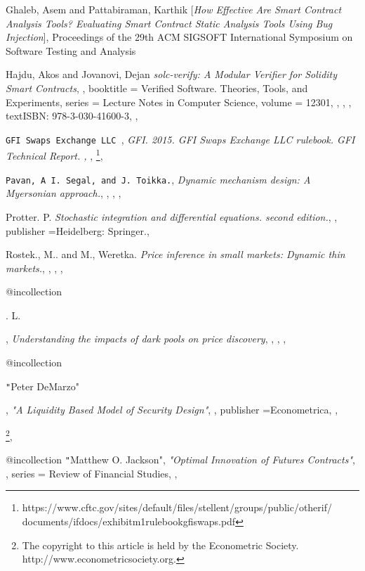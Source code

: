  \begin{thebibliography}{9}

Ghaleb, Asem and Pattabiraman, Karthik
[\textit{How Effective Are Smart Contract Analysis Tools? Evaluating Smart Contract Static Analysis Tools Using Bug Injection}],
Proceedings of the 29th ACM SIGSOFT International Symposium on Software Testing and Analysis

 
Hajdu, Akos and Jovanovi,  Dejan
\textit{solc-verify: A Modular Verifier for {S}olidity Smart Contracts},
,
    booktitle  = {Verified Software. Theories, Tools, and Experiments},
    series     = {Lecture Notes in Computer Science},
    volume     = {12301},
,
,
,
text{ISBN: 978-3-030-41600-3},
,


\texttt{GFI Swaps Exchange LLC },
\textit{GFI. 2015. GFI Swaps Exchange LLC rulebook. GFI Technical Report.
,
    },
\footnote{https://www.cftc.gov/sites/default/files/stellent/groups/public/otherif/
documents/ifdocs/exhibitm1rulebookgfiswaps.pdf},

   
\texttt{Pavan, A I. Segal, and J. Toikka.},
\textit{Dynamic mechanism design: A Myersonian approach.},
,
,
,


Protter. P.
\textit{Stochastic integration and diﬀerential equations. second edition.},
,
    publisher  ={Heidelberg: Springer.},


Rostek., M.. and M., Weretka.
\textit{ Price inference in small markets: Dynamic thin markets.},
,
,
,


@incollection{
        
\textttYe. L.},
\textit{ Understanding the impacts of dark pools on price discovery},
,
,
,


@incollection{
    
\texttt"Peter DeMarzo"},
\textit{"A Liquidity Based Model of Security Design"},
,
    publisher  ={Econometrica},
,

    
    \footnote{The copyright to this article is held by the Econometric Society. http://www.econometricsociety.org.},

@incollection{
\texttt"Matthew O. Jackson"},
\textit{"Optimal Innovation of Futures Contracts"},
,
    series     = { Review of Financial Studies},
,


\end{thebibliography}

